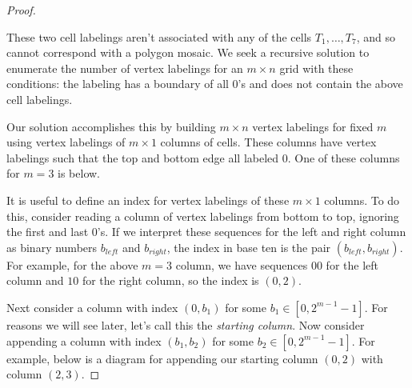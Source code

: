 \documentclass[12pt]{article}
\theoremstyle{plain}
\theoremstyle{definition}
\theoremstyle{remark}
\theoremstyle{definition}
\newcommand{\cell}[4]{ \draw[thick] ( #1 , #2 ) rectangle ( #3 , #4 );}
\newcommand{\lablnode}[3]{\node[shape=circle,draw=none,fill=none, inner sep=0pt,minimum size=5pt] (A) at ( #1 , #2 ) {#3};}
\newcommand{\lablvertex}[3]{\node[shape=circle,draw=none,fill=white, inner sep=2pt,minimum size=5pt] (A) at ( #1 , #2 ) {#3};}
\begin{document}
\begin{proof}
\begin{center}
\begin{tikzpicture}
    \end{tikzpicture}
\end{center}

These two cell labelings aren't associated with any of the cells $T_1, \dots, T_7$, and so cannot correspond with a polygon mosaic. We seek a recursive solution to enumerate the number of vertex labelings for an $m \times n$ grid with these  conditions: the labeling has a boundary of all $0$'s and does not contain the above cell labelings. 

Our solution accomplishes this by building $m \times n$ vertex labelings for fixed $m$ using vertex labelings of $m \times 1$ columns of cells. These columns have vertex labelings such that the top and bottom edge all labeled $0$. One of these columns for $m=3$ is below.

\begin{center}
\end{center}

It is useful to define an index for vertex labelings of these $m \times 1$ columns. To do this, consider reading a column of vertex labelings from bottom to top, ignoring the first and last $0$'s. If we interpret these sequences for the left and right column as binary numbers $b_{left}$ and $b_{right}$, the index in base ten is the pair $(b_{left}, b_{right})$. For example, for the above $m=3$ column, we have sequences $00$ for the left column and $10$ for the right column, so the index is $(0,2)$.

Next consider a column with index $(0, b_{1})$ for some $b_{1} \in [0,2^{m-1}-1]$. For reasons we will see later, let's call this the \textit{starting column}. Now consider appending a column with index $(b_{1}, b_{2})$ for some $b_{2} \in [0,2^{m-1}-1]$. For example, below is a diagram for appending our starting column $(0,2)$ with column $(2,3)$. 


\end{proof}
\end{document}
